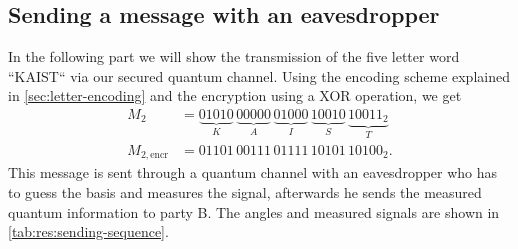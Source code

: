\subsection{Sending a message with an eavesdropper}
\label{sec:Sending a message without an eavesdropper}
In the following part we will show the transmission of the five letter word ``KAIST`` via our
secured quantum channel. Using the encoding scheme explained in \autoref{sec:letter-encoding} 
and the encryption using a XOR operation, we get 
\begin{align}
  M_2 &= \underbrace{01010}_{K} \, 
  \underbrace{00000}_{A} \,
  \underbrace{01000}_{I} \, 
  \underbrace{10010}_{S} \, 
  \underbrace{10011_2}_{T} \\
  M_{2, \text{encr}} &= 01101 \, 00111 \, 01111 \, 10101 \, 10100_2.
\end{align}
This message is sent through a quantum channel with an eavesdropper who has to guess the basis and
measures the signal, afterwards he sends the measured quantum information to party B. The angles and
measured signals are shown in \autoref{tab:res:sending-sequence}.

